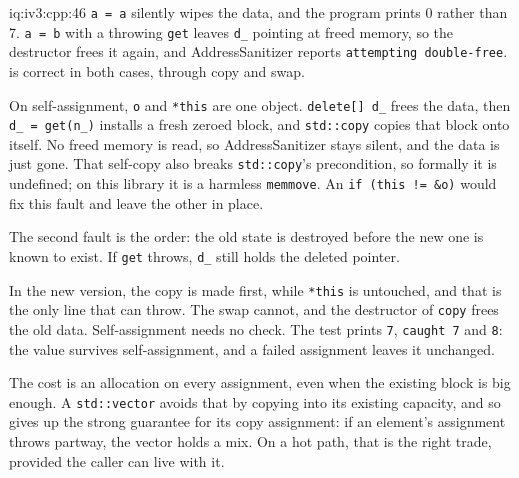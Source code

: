 \begin{solution}{iq:iv3:cpp:46}
\texttt{a = a} silently wipes the data, and the program prints 0 rather than 7. \texttt{a = b} with a throwing \texttt{get} leaves \texttt{d\_} pointing at freed memory, so the destructor frees it again, and AddressSanitizer reports \texttt{attempting double-free}.  is correct in both cases, through copy and swap.
\enlargethispage{-3\baselineskip}%
\label{lst:iv3:cp:assigngood}

On self-assignment, \texttt{o} and \texttt{*this} are one object. \texttt{delete[] d\_} frees the data, then \texttt{d\_ = get(n\_)} installs a fresh zeroed block, and \texttt{std::copy} copies that block onto itself. No freed memory is read, so AddressSanitizer stays silent, and the data is just gone. That self-copy also breaks \texttt{std::copy}'s precondition, so formally it is undefined; on this library it is a harmless \texttt{memmove}. An \texttt{if (this != \&o)} would fix this fault and leave the other in place.

The second fault is the order: the old state is destroyed before the new one is known to exist. If \texttt{get} throws, \texttt{d\_} still holds the deleted pointer.

In the new version, the copy is made first, while \texttt{*this} is untouched, and that is the only line that can throw. The swap cannot, and the destructor of \texttt{copy} frees the old data. Self-assignment needs no check. The test prints \texttt{7}, \texttt{caught 7} and \texttt{8}: the value survives self-assignment, and a failed assignment leaves it unchanged.

The cost is an allocation on every assignment, even when the existing block is big enough. A \texttt{std::vector} avoids that by copying into its existing capacity, and so gives up the strong guarantee for its copy assignment: if an element's assignment throws partway, the vector holds a mix. On a hot path, that is the right trade, provided the caller can live with it.

\end{solution}

